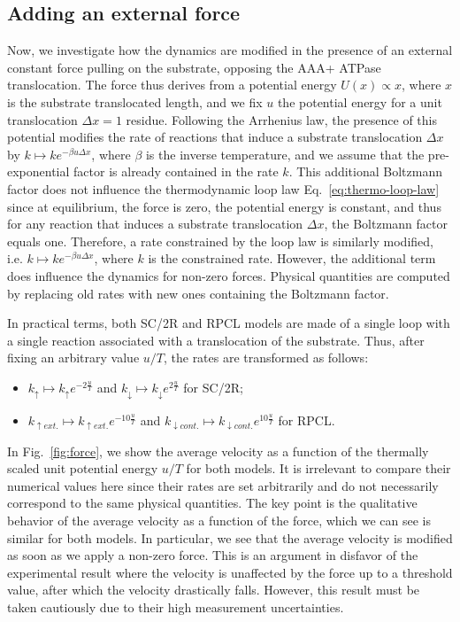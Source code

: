 \subsection{Adding an external force}
\label{subsec:force}
    Now, we investigate how the dynamics are modified in the presence of an external constant force pulling on the substrate, opposing the AAA+ ATPase translocation. The force thus derives from a potential energy $U(x) \propto x$, where $x$ is the substrate translocated length, and we fix $u$ the potential energy for a unit translocation $\Delta x = 1$ residue. Following the Arrhenius law, the presence of this potential modifies the rate of reactions that induce a substrate translocation $\Delta x$ by $k\mapsto k e^{-\beta u \Delta x }$, where $\beta$ is the inverse temperature, and we assume that the pre-exponential factor is already contained in the rate $k$. This additional Boltzmann factor does not influence the thermodynamic loop law Eq.~\eqref{eq:thermo-loop-law} since at equilibrium, the force is zero, the potential energy is constant, and thus for any reaction that induces a substrate translocation $\Delta x$, the Boltzmann factor equals one. Therefore, a rate constrained by the loop law is similarly modified, i.e. $k\mapsto k e^{-\beta u \Delta x }$, where $k$ is the constrained rate. However, the additional term does influence the dynamics for non-zero forces. Physical quantities are computed by replacing old rates with new ones containing the Boltzmann factor.

    In practical terms, both SC/2R and RPCL models are made of a single loop with a single reaction associated with a translocation of the substrate. Thus, after fixing an arbitrary value $u/T$, the rates are transformed as follows:
    \begin{itemize}
        \item $k_\uparrow\mapsto k_\uparrow e^{-2 \frac{u}{T}}$ and $k_\downarrow\mapsto k_\downarrow e^{2 \frac{u}{T}}$ for SC/2R;
        \item $k_{\uparrow ext.} \mapsto k_{\uparrow ext.} e^{-10 \frac{u}{T}}$ and $k_{\downarrow cont.} \mapsto k_{\downarrow cont.} e^{10 \frac{u}{T}}$ for RPCL.
    \end{itemize}
    
    In Fig.~\ref{fig:force}, we show the average velocity as a function of the thermally scaled unit potential energy $u/T$ for both models. It is irrelevant to compare their numerical values here since their rates are set arbitrarily and do not necessarily correspond to the same physical quantities. The key point is the qualitative behavior of the average velocity as a function of the force, which we can see is similar for both models. In particular, we see that the average velocity is modified as soon as we apply a non-zero force. This is an argument in disfavor of the experimental result where the velocity is unaffected by the force up to a threshold value, after which the velocity drastically falls\cite{avellaneda_processive_2020}. However, this result must be taken cautiously due to their high measurement uncertainties.


